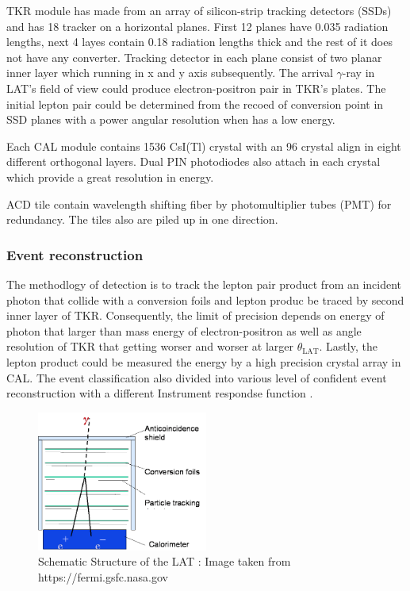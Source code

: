 \par TKR module has made from an array of silicon-strip tracking detectors (SSDs) and has 18 tracker on a horizontal planes. First 12 planes have 0.035 radiation lengths, next 4 layes contain 0.18 radiation lengths thick and the rest of it does not have any converter.
Tracking detector in each plane consist of two planar inner layer which running in x and y axis subsequently. The arrival $\gamma$-ray in LAT's field of view could produce electron-positron pair in TKR's plates.
The initial lepton pair could be determined from the recoed of conversion point in SSD planes with a power angular resolution when has a low energy.

\par Each CAL module contains 1536 CsI(Tl) crystal with an 96 crystal align in eight different orthogonal layers.
Dual PIN photodiodes also attach in each crystal which provide a great resolution in energy.

\par ACD tile contain wavelength shifting fiber by photomultiplier tubes (PMT) for redundancy. 
The tiles also are piled up in one direction.


\subsubsection*{Event reconstruction}
The methodlogy of detection is to track the lepton pair product from an incident photon that collide with a conversion foils and lepton produc be traced by second inner layer of TKR.
Consequently, the limit of precision depends on energy of photon that larger than mass energy of electron-positron as well as angle resolution of TKR that getting worser and worser at larger $\theta_\text{LAT}$.
Lastly, the lepton product could be measured the energy by a high precision crystal array in CAL. The event classification also divided into various level of confident event reconstruction with a different Instrument respondse function \cite{FermiDetail,Atwood:2013rka}.


\begin{figure}[h!]
  \centering
    \includegraphics[width=0.5\textwidth]{img/LATMethodology}
    \caption{Schematic Structure of the LAT : Image taken from https://fermi.gsfc.nasa.gov}
  \end{figure}
